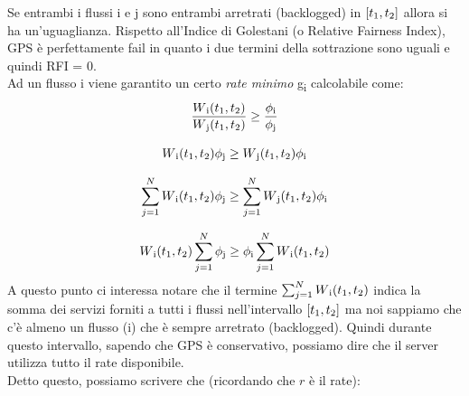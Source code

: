 \documentclass{article}
\begin{document}
Se entrambi i flussi i e j sono entrambi arretrati (backlogged) in \( [t\textsubscript{1}, t\textsubscript{2}] \) allora si ha un'uguaglianza. Rispetto all'Indice di Golestani (o Relative Fairness Index), GPS è perfettamente fail in quanto i due termini della sottrazione sono uguali e quindi RFI = 0.\\
Ad un flusso i viene garantito un certo \textit{rate minimo} g\textsubscript{i} calcolabile come:
\[ \frac{W\textsubscript{i}(t\textsubscript{1}, t\textsubscript{2})}{W\textsubscript{j}(t\textsubscript{1}, t\textsubscript{2})} \geq \frac{\phi\textsubscript{i}}{\phi\textsubscript{j}}\]

\[ W\textsubscript{i}(t\textsubscript{1}, t\textsubscript{2})\phi\textsubscript{j} \geq W\textsubscript{j}(t\textsubscript{1}, t\textsubscript{2})\phi\textsubscript{i}\]

\[ \sum_{j=1}^{N} W\textsubscript{i}(t\textsubscript{1}, t\textsubscript{2})\phi\textsubscript{j} \geq \sum_{j=1}^{N} W\textsubscript{j}(t\textsubscript{1}, t\textsubscript{2})\phi\textsubscript{i} \]

\[ W\textsubscript{i}(t\textsubscript{1}, t\textsubscript{2})\sum_{j=1}^{N} \phi\textsubscript{j} \geq 
\phi\textsubscript{i}\sum_{j=1}^{N} W\textsubscript{i}(t\textsubscript{1}, t\textsubscript{2}) \]
A questo punto ci interessa notare che il termine \( \sum_{j=1}^{N} W\textsubscript{i}(t\textsubscript{1}, t\textsubscript{2}) \) indica la somma dei servizi forniti a tutti i flussi nell'intervallo \( [t\textsubscript{1}, t\textsubscript{2}] \) ma noi sappiamo che c'è almeno un flusso (i) che è sempre arretrato (backlogged). Quindi durante questo intervallo, sapendo che GPS è conservativo, possiamo dire che il server utilizza tutto il rate disponibile.\\
Detto questo, possiamo scrivere che (ricordando che \( r \) è il rate):
\end{document}
